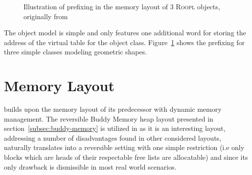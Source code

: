 \begin{figure}[ht]
\begin{subfigure}[t]{.32\textwidth}
    \end{subfigure}
    \begin{subfigure}[t]{.32\textwidth}
        \vskip 0pt
        \centering
    \end{subfigure}
    
    \caption[Illustration of object memory layout]{Illustration of prefixing in the memory layout of 3 \textsc{Roopl} objects, originally from~\cite{th:roopl}}
    \label{fig:roopl-object-layout}
\end{figure}

The object model is simple and only features one additional word for storing the address of the virtual table for the object class. Figure~\ref{fig:roopl-object-layout} shows the prefixing for three simple classes modeling geometric shapes.


\section{\rooplpp Memory Layout}
\label{sec:rooplpp-memory-layout}
\rooplpp builds upon the memory layout of its predecessor  with dynamic memory management. The reversible Buddy Memory heap layout presented in section~\ref{subsec:buddy-memory} is utilized in \rooplpp as it is an interesting layout, addressing a number of disadvantages found in other considered layouts, naturally translates into a reversible setting with one simple restriction (i.e only blocks which are heads of their respectable free lists are allocatable) and since its only drawback is dismissible in most real world scenarios.

